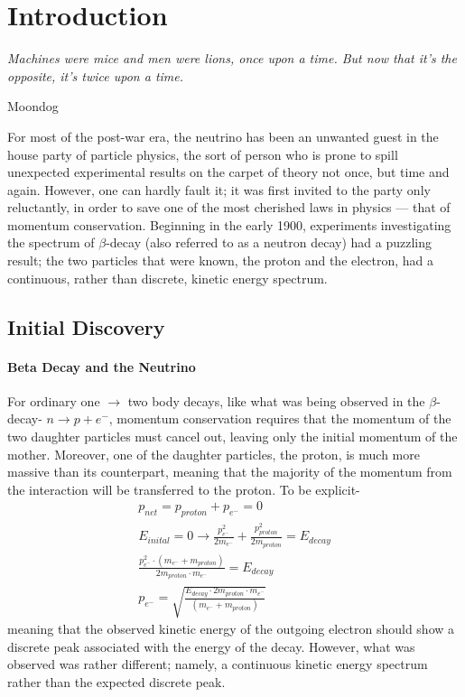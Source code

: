 \chapter{Introduction}
\label{chap:Intro}
\vspace{-1em}
\epigraph{
  \textit{Machines were mice and men were lions, once upon a time. But now that it's the opposite, it's twice upon a time.}
}{Moondog \cite{Moondog}}
%


For most of the post-war era, the neutrino has been an unwanted guest in the house party of particle physics, the sort of person who is prone to spill unexpected experimental results on the carpet of theory not once, but time and again. However, one can hardly fault it; it was first invited to the party only reluctantly, in order to save one of the most cherished laws in physics --- that of momentum conservation. Beginning in the early 1900, experiments investigating the spectrum of $\beta$-decay (also referred to as a neutron decay) had a puzzling result; the two particles that were known, the proton and the electron, had a continuous, rather than discrete, kinetic energy spectrum. 

\section{Initial Discovery}
\subsubsection{Beta Decay and the Neutrino}
For ordinary one $\rightarrow$ two body decays, like what was being observed in the $\beta$-decay-  $n \rightarrow p + e^{-} $, momentum conservation requires that the momentum of the two daughter particles must cancel out, leaving only the initial momentum of the mother. Moreover, one of the daughter particles, the proton, is much more massive than its counterpart, meaning that the majority of the momentum from the interaction will be transferred to the proton. To be explicit-
\begin{eqnarray}
p_{net}= p_{proton} +p_{e^-} =0\\
E_{inital}= 0 \rightarrow \frac{p^2_{e^-}}{2m_{e^-}} +\frac{p^2_{proton}}{2m_{proton}} = E_{decay}\\
\frac{p^{2}_{e^-} \cdot (m_{e^-}+m_{proton})}{2m_{proton} \cdot m_{e^-}} = E_{decay} \\
p_{e^-} = \sqrt{\frac{E_{decay} \cdot 2m_{proton} \cdot m_{e^-}}{(m_{e^-}+m_{proton})}}
\end{eqnarray} 
meaning that the observed kinetic energy of the outgoing electron should show a discrete peak associated with the energy of the decay. However, what was observed was rather different; namely,  a continuous kinetic energy spectrum \cite{Beta_Spectrum} rather than the expected discrete peak. 


